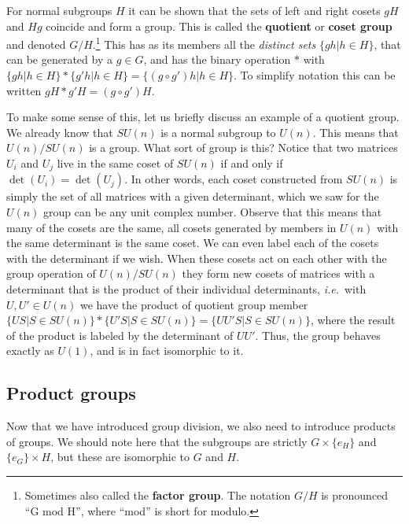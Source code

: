 \documentclass[notes.tex]{subfiles}
\begin{document}
For normal subgroups $H$ it can be shown that the sets of left and right cosets $gH$ and $Hg$ coincide and form a group. This is called the {\bf quotient}  or {\bf coset group} and denoted $G/H$.\footnote{Sometimes also called the {\bf factor group}. The notation $G/H$ is pronounced ``G mod H'', where ``mod'' is short for modulo.}
This has as its members all the {\it distinct sets} $\{gh|h\in H\}$, that can be generated by a $g\in G$, and has the binary operation $*$ with $\{gh|h\in H\}*\{g'h|h\in H\}=\{ (g\circ g')h| h\in H\}$. To simplify notation this can be written $gH*g'H=(g\circ g') H$. 
 
To make some sense of this, let us briefly discuss an example of a quotient group. We already know that $SU(n)$ is a normal subgroup to $U(n)$. This means that $U(n)/SU(n)$ is a group. What sort of group is this? Notice that two matrices $U_i$ and $U_j$ live in the same coset of $SU(n)$ if and only if $\det(U_i)=\det(U_j)$. In other words, each coset constructed from $SU(n)$ is simply the set of all matrices with a given determinant, which we saw for the $U(n)$ group can be any unit complex number. Observe that this means that many of the cosets are the same, all cosets generated by members in $U(n)$ with the same determinant is the same coset. We can even label each of the cosets with the determinant if we wish.
When these cosets act on each other with the group operation of $U(n)/SU(n)$ they form new cosets of matrices with a determinant that is the product of their individual determinants, {\it i.e.}\ with $U,U'\in U(n)$ we have the product of quotient group member $\{US|S\in SU(n)\}*\{U'S| S\in SU(n)\}=\{ UU'S| S\in SU(n)\}$, where the result of the product is labeled by the determinant of $UU'$. Thus, the group behaves exactly as $U(1)$, and is in fact isomorphic to it.

\subsection{Product groups}
Now that we have introduced group division,  we also need to introduce products of groups. 
We should note here that the subgroups are strictly $G\times\{e_H\}$ and $\{e_G\}\times H$, but these are isomorphic to $G$ and $H$.
\end{document}
